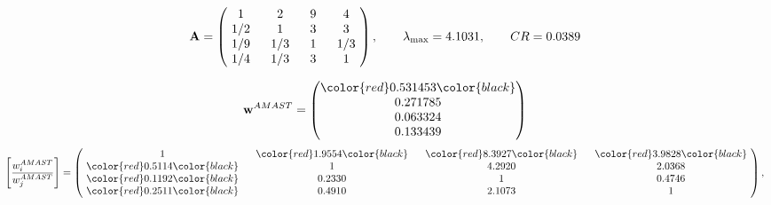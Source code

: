 \begin{example}
\begin{equation*}
\mathbf{A} =
\begin{pmatrix}
$\,\,$ 1 $\,\,$ & $\,\,$2$\,\,$ & $\,\,$9$\,\,$ & $\,\,$4 $\,\,$ \\
$\,\,$ 1/2$\,\,$ & $\,\,$ 1 $\,\,$ & $\,\,$3$\,\,$ & $\,\,$3 $\,\,$ \\
$\,\,$ 1/9$\,\,$ & $\,\,$ 1/3$\,\,$ & $\,\,$ 1 $\,\,$ & $\,\,$ 1/3 $\,\,$ \\
$\,\,$ 1/4$\,\,$ & $\,\,$ 1/3$\,\,$ & $\,\,$3$\,\,$ & $\,\,$ 1  $\,\,$ \\
\end{pmatrix},
\qquad
\lambda_{\max} =
4.1031,
\qquad
CR = 0.0389
\end{equation*}

\begin{equation*}
\mathbf{w}^{AMAST} =
\begin{pmatrix}
\color{red} 0.531453\color{black} \\
0.271785\\
0.063324\\
0.133439
\end{pmatrix}\end{equation*}
\begin{equation*}
\left[ \frac{{w}^{AMAST}_i}{{w}^{AMAST}_j} \right] =
\begin{pmatrix}
$\,\,$ 1 $\,\,$ & $\,\,$\color{red} 1.9554\color{black} $\,\,$ & $\,\,$\color{red} 8.3927\color{black} $\,\,$ & $\,\,$\color{red} 3.9828\color{black} $\,\,$ \\
$\,\,$\color{red} 0.5114\color{black} $\,\,$ & $\,\,$ 1 $\,\,$ & $\,\,$4.2920$\,\,$ & $\,\,$2.0368  $\,\,$ \\
$\,\,$\color{red} 0.1192\color{black} $\,\,$ & $\,\,$0.2330$\,\,$ & $\,\,$ 1 $\,\,$ & $\,\,$0.4746 $\,\,$ \\
$\,\,$\color{red} 0.2511\color{black} $\,\,$ & $\,\,$0.4910$\,\,$ & $\,\,$2.1073$\,\,$ & $\,\,$ 1  $\,\,$ \\
\end{pmatrix},
\end{equation*}


\end{example}
